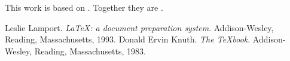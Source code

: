 \documentclass{article}
\begin{document}
This work is based on \cite{latexdps}.
Together they are \cite{latexdps, texbook}.

\begin{thebibliography}{9}
Leslie Lamport.
\textit{\LaTeX{}: a document preparation system}.
Addison-Wesley, Reading, Massachusetts, 1993.
Donald Ervin Knuth.
\textit{The \TeX book}.
Addison-Wesley, Reading, Massachusetts, 1983.
\end{thebibliography}
\end{document}
